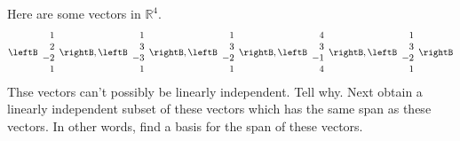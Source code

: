 \begin{enumialphparenastyle}
\begin{ex} Here are some vectors in $\mathbb{R}^{4}$. 
\begin{equation*}
\leftB 
\begin{array}{r}
1 \\ 
2 \\ 
-2 \\ 
1
\end{array}
\rightB ,\leftB 
\begin{array}{r}
1 \\ 
3 \\ 
-3 \\ 
1
\end{array}
\rightB ,\leftB 
\begin{array}{r}
1 \\ 
3 \\ 
-2 \\ 
1
\end{array}
\rightB ,\leftB 
\begin{array}{r}
4 \\ 
3 \\ 
-1 \\ 
4
\end{array}
\rightB ,\leftB 
\begin{array}{r}
1 \\ 
3 \\ 
-2 \\ 
1
\end{array}
\rightB
\end{equation*}
Thse vectors can't possibly be linearly independent. Tell why. Next obtain a
linearly independent subset of these vectors which has the same span as
these vectors. In other words, find a basis for the span of these vectors.
\end{ex}


\end{enumialphparenastyle}
